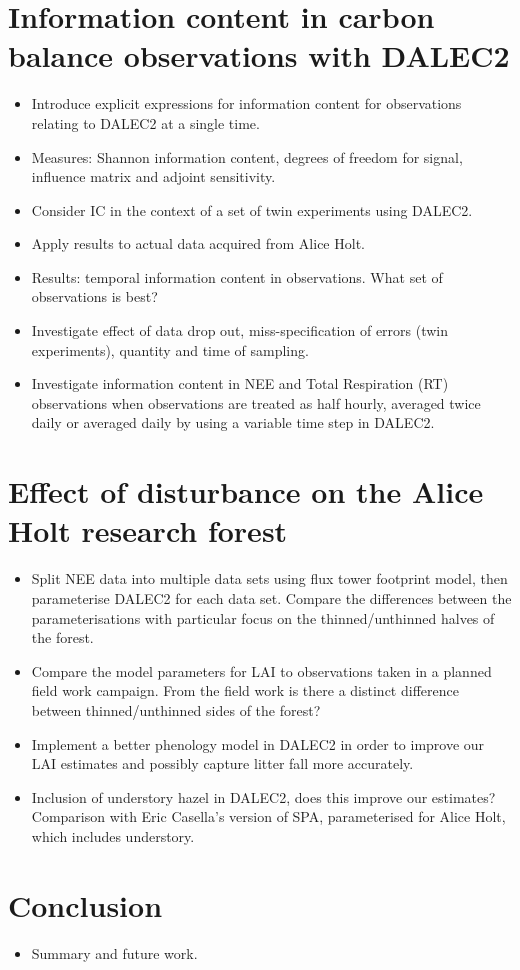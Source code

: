 \documentclass[11pt]{article}
\begin{document}
\section{Information content in carbon balance observations with DALEC2}
\begin{itemize}
\item Introduce explicit expressions for information content for observations relating to DALEC2 at a single time.
\item Measures: Shannon information content, degrees of freedom for signal, influence matrix and adjoint sensitivity.
\item Consider IC in the context of a set of twin experiments using DALEC2.
\item Apply results to actual data acquired from Alice Holt.
\item Results: temporal information content in observations. What set of observations is best?
\item Investigate effect of data drop out, miss-specification of errors (twin experiments), quantity and time of sampling.
\item Investigate information content in NEE and Total Respiration (RT) observations when observations are treated as half hourly, averaged twice daily or averaged daily by using a variable time step in DALEC2.   
\end{itemize}


\section{Effect of disturbance on the Alice Holt research forest}
\begin{itemize}
\item Split NEE data into multiple data sets using flux tower footprint model, then parameterise DALEC2 for each data set. Compare the differences between the parameterisations with particular focus on the thinned/unthinned halves of the forest.
\item Compare the model parameters for LAI to observations taken in a planned field work campaign. From the field work is there a distinct difference between thinned/unthinned sides of the forest?
\item Implement a better phenology model in DALEC2 in order to improve our LAI estimates and possibly capture litter fall more accurately.
\item Inclusion of understory hazel in DALEC2, does this improve our estimates? Comparison with Eric Casella's version of SPA, parameterised for Alice Holt, which includes understory.
\end{itemize}


\section{Conclusion}
\begin{itemize}
\item Summary and future work.
\end{itemize}

{}
\end{document}
